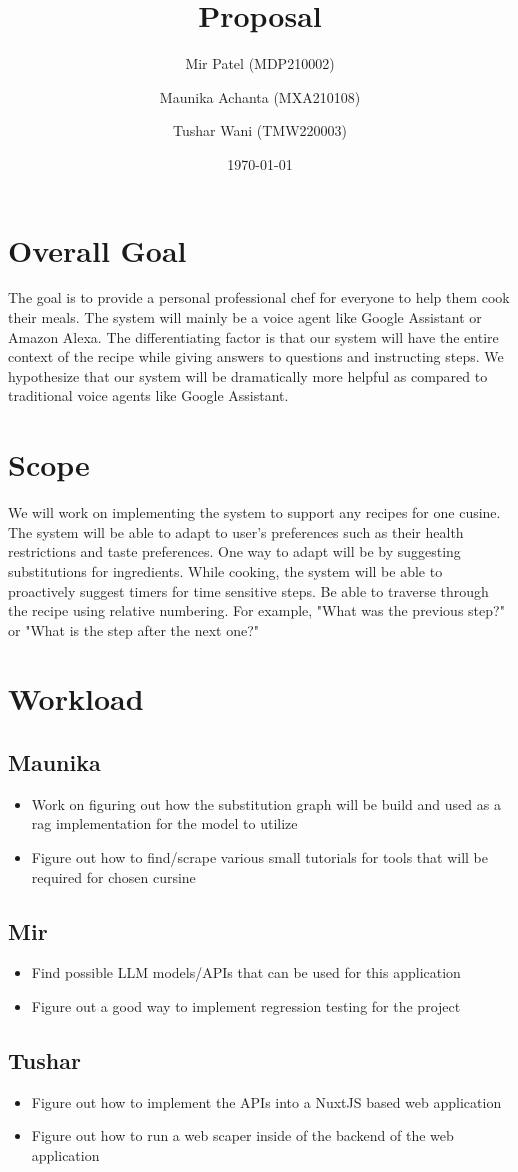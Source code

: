 \documentclass{article}
\title{Proposal}
\author{Mir Patel (MDP210002) \and Maunika Achanta (MXA210108) \and Tushar Wani (TMW220003)}
\date{\today}
\begin{document}
\maketitle

\section{Overall Goal}
The goal is to provide a personal professional chef for everyone to help them cook their meals. The system will mainly be a voice agent like Google Assistant or Amazon Alexa. The differentiating factor is that our system will have the entire context of the recipe while giving answers to questions and instructing steps. We hypothesize that our system will be dramatically more helpful as compared to traditional voice agents like Google Assistant.

\section{Scope}
We will work on implementing the system to support any recipes for one cusine. The system will be able to adapt to user's preferences such as their health restrictions and taste preferences. One way to adapt will be by suggesting substitutions for ingredients. While cooking, the system will be able to proactively suggest timers for time sensitive steps. Be able to traverse through the recipe using relative numbering. For example, "What was the previous step?" or "What is the step after the next one?"

\section{Workload}
\subsection{Maunika}
\begin{itemize}
  \item Work on figuring out how the substitution graph will be build and used as a rag implementation for the model to utilize
  \item Figure out how to find/scrape various small tutorials for tools that will be required for chosen cursine
\end{itemize}

\subsection{Mir}
\begin{itemize}
  \item Find possible LLM models/APIs that can be used for this application
  \item Figure out a good way to implement regression testing for the project
\end{itemize}

\subsection{Tushar}
\begin{itemize}
  \item Figure out how to implement the APIs into a NuxtJS based web application
  \item Figure out how to run a web scaper inside of the backend of the web application
\end{itemize}
\end{document}
